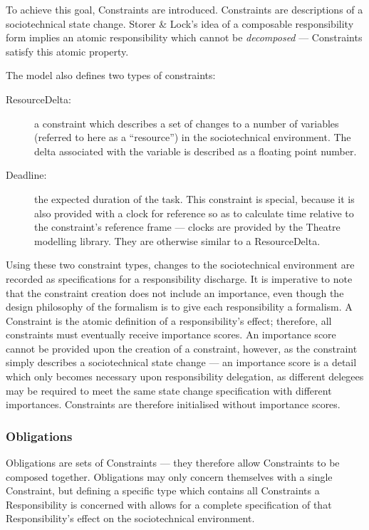 To achieve this goal, Constraints are introduced. Constraints are descriptions of a sociotechnical state change. Storer \& Lock's idea of a composable responsibility form implies an atomic responsibility which cannot be \emph{decomposed} --- Constraints satisfy this atomic property.\par

The model also defines two types of constraints:

\begin{description}
    \item [ResourceDelta: ] a constraint which describes a set of changes to a number of variables (referred to here as a ``resource'') in the sociotechnical environment. The delta associated with the variable is described as a floating point number.
    \item [Deadline: ] the expected duration of the task. This constraint is special, because it is also provided with a clock for reference so as to calculate time relative to the constraint's reference frame --- clocks are provided by the Theatre modelling library\cite{theatre_code}. They are otherwise similar to a ResourceDelta.
\end{description}

Using these two constraint types, changes to the sociotechnical environment are recorded as specifications for a responsibility discharge. It is imperative to note that the constraint creation does not include an importance, even though the design philosophy of the formalism is to give each responsibility a formalism. A Constraint is the atomic definition of a responsibility's effect; therefore, all constraints must eventually receive importance scores. An importance score cannot be provided upon the creation of a constraint, however, as the constraint simply describes a sociotechnical state change --- an importance score is a detail which only becomes necessary upon responsibility delegation, as different delegees may be required to meet the same state change specification with different importances. Constraints are therefore initialised without importance scores.\par

\subsubsection{Obligations}  %
Obligations are sets of Constraints --- they therefore allow Constraints to be composed together. Obligations may only concern themselves with a single Constraint, but defining a specific type which contains all Constraints a Responsibility is concerned with allows for a complete specification of that Responsibility's effect on the sociotechnical environment.\par

